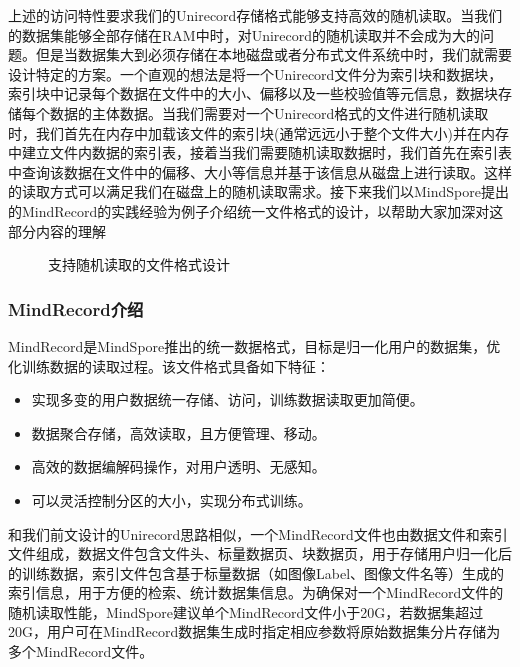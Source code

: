 \documentclass[letterpaper,10pt,english]{sphinxmanual}
\let\sphinxpxdimen\pdfpxdimen\else\newdimen\sphinxpxdimen
\begin{document}
\sphinxAtStartPar
上述的访问特性要求我们的Unirecord存储格式能够支持高效的随机读取。当我们的数据集能够全部存储在RAM中时，对Unirecord的随机读取并不会成为大的问题。但是当数据集大到必须存储在本地磁盘或者分布式文件系统中时，我们就需要设计特定的方案。一个直观的想法是将一个Unirecord文件分为索引块和数据块，索引块中记录每个数据在文件中的大小、偏移以及一些校验值等元信息，数据块存储每个数据的主体数据。当我们需要对一个Unirecord格式的文件进行随机读取时，我们首先在内存中加载该文件的索引块(通常远远小于整个文件大小)并在内存中建立文件内数据的索引表，接着当我们需要随机读取数据时，我们首先在索引表中查询该数据在文件中的偏移、大小等信息并基于该信息从磁盘上进行读取。这样的读取方式可以满足我们在磁盘上的随机读取需求。接下来我们以MindSpore提出的MindRecord的实践经验为例子介绍统一文件格式的设计，以帮助大家加深对这部分内容的理解

\begin{figure}[H]
\centering
\capstart

\noindent\sphinxincludegraphics[width=800\sphinxpxdimen]{{file_indexing}.png}
\caption{支持随机读取的文件格式设计}\label{\detokenize{chapter_data_processing/performance:id14}}\label{\detokenize{chapter_data_processing/performance:file-random-access}}\end{figure}


\subsubsection{MindRecord介绍}
\label{\detokenize{chapter_data_processing/performance:mindrecord}}
\sphinxAtStartPar
MindRecord是MindSpore推出的统一数据格式，目标是归一化用户的数据集，优化训练数据的读取过程。该文件格式具备如下特征：
\begin{itemize}
\item {} 
\sphinxAtStartPar
实现多变的用户数据统一存储、访问，训练数据读取更加简便。

\item {} 
\sphinxAtStartPar
数据聚合存储，高效读取，且方便管理、移动。

\item {} 
\sphinxAtStartPar
高效的数据编解码操作，对用户透明、无感知。

\item {} 
\sphinxAtStartPar
可以灵活控制分区的大小，实现分布式训练。

\end{itemize}

\sphinxAtStartPar
和我们前文设计的Unirecord思路相似，一个MindRecord文件也由数据文件和索引文件组成，数据文件包含文件头、标量数据页、块数据页，用于存储用户归一化后的训练数据，索引文件包含基于标量数据（如图像Label、图像文件名等）生成的索引信息，用于方便的检索、统计数据集信息。为确保对一个MindRecord文件的随机读取性能，MindSpore建议单个MindRecord文件小于20G，若数据集超过20G，用户可在MindRecord数据集生成时指定相应参数将原始数据集分片存储为多个MindRecord文件。
\end{document}
